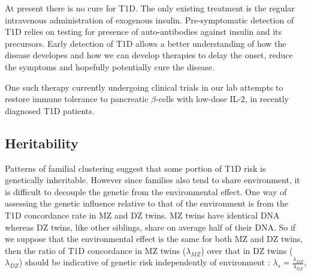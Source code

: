 At present there is no cure for \gls{T1D}.
The only existing treatment is the regular intravenous administration of exogenous insulin.  
Pre-symptomatic detection of T1D relies on testing for presence of auto-antibodies against insulin and its precursors.
Early detection of T1D allows a better understanding of how the disease developes and how we can develop therapies to delay the onset,
reduce the symptoms and hopefully potentially cure the disease.  

One such therapy currently undergoing clinical trials in our lab attempts to restore immune tolerance to pancreatic $\beta$-cells with low-dose \Gls{IL-2},
in recently diagnosed \gls{T1D} patients.


\subsection{Heritability}


Patterns of familial clustering suggest that some portion of T1D risk is genetically inheritable.
However since families also tend to share environment, it is difficult to decouple the genetic from the environmental effect.
One way of assessing the genetic influence relative to that of the environment is from the T1D concordance rate in \gls{MZ} and \gls{DZ} twins.
MZ twins have identical \gls{DNA} whereas DZ twins, like other siblings, share on average half of their DNA.
So if we suppose that the environmental effect is the same for both \gls{MZ} and \gls{DZ} twins, then the ratio of T1D concordance in \gls{MZ} twins ($\lambda_{MZ}$) 
over that in DZ twins ($\lambda_{DZ}$) should be indicative of genetic risk independently of environment \citep{Clayton:2009kf}:
$ \lambda_s = \frac{\lambda_{MZ}}{\lambda_{DZ}}$,

